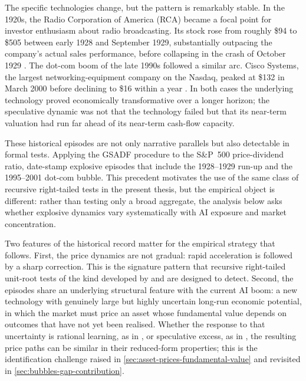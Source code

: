 The specific technologies change, but the pattern is remarkably stable. In the 1920s, the Radio Corporation of America (RCA) became a focal point for investor enthusiasm about radio broadcasting. Its stock rose from roughly \$94 to \$505 between early 1928 and September 1929, substantially outpacing the company's actual sales performance, before collapsing in the crash of October 1929 \citep{brunerMiller2019,sirkin1975}. The dot-com boom of the late 1990s followed a similar arc. Cisco Systems, the largest networking-equipment company on the Nasdaq, peaked at \$132 in March 2000 before declining to \$16 within a year \citep{hirschey2001}. In both cases the underlying technology proved economically transformative over a longer horizon; the speculative dynamic was not that the technology failed but that its near-term valuation had run far ahead of its near-term cash-flow capacity.

These historical episodes are not only narrative parallels but also detectable in formal tests. Applying the GSADF procedure to the S\&P~500 price-dividend ratio, \citet{phillipsShiYu2015a} date-stamp explosive episodes that include the 1928--1929 run-up and the 1995--2001 dot-com bubble. This precedent motivates the use of the same class of recursive right-tailed tests in the present thesis, but the empirical object is different: rather than testing only a broad aggregate, the analysis below asks whether explosive dynamics vary systematically with AI exposure and market concentration.

Two features of the historical record matter for the empirical strategy that follows. First, the price dynamics are not gradual: rapid acceleration is followed by a sharp correction. This is the signature pattern that recursive right-tailed unit-root tests of the kind developed by \citet{phillipsWuYu2011} and \citet{phillipsShiYu2015a} are designed to detect. Second, the episodes share an underlying structural feature with the current AI boom: a new technology with genuinely large but highly uncertain long-run economic potential, in which the market must price an asset whose fundamental value depends on outcomes that have not yet been realised. Whether the response to that uncertainty is rational learning, as in \citet{pastorVeronesi2009}, or speculative excess, as in \citet{shiller2000}, the resulting price paths can be similar in their reduced-form properties; this is the identification challenge raised in \cref{sec:asset-prices-fundamental-value} and revisited in \cref{sec:bubbles-gap-contribution}.

